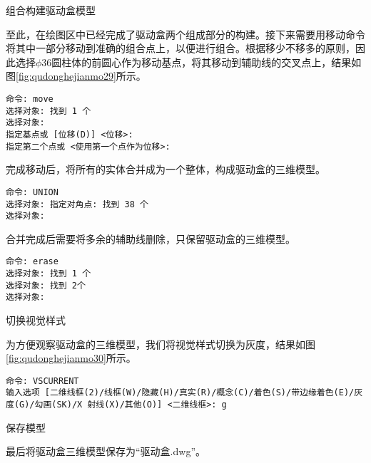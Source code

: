 \begin{procedure}
\item 组合构建驱动盒模型

至此，在绘图区中已经完成了驱动盒两个组成部分的构建。接下来需要用移动命令将其中一部分移动到准确的组合点上，以便进行组合。根据移少不移多的原则，因此选择$\phi 36$圆柱体的前圆心作为移动基点，将其移动到辅助线的交叉点上，结果如图\ref{fig:qudonghejianmo29}所示。

\begin{figure}[htbp]
\centering
\begin{floatrow}[2]
\end{floatrow}
\end{figure}
\begin{lstlisting}
命令: move
选择对象: 找到 1 个
选择对象:
指定基点或 [位移(D)] <位移>:
指定第二个点或 <使用第一个点作为位移>:
\end{lstlisting}

完成移动后，将所有的实体合并成为一个整体，构成驱动盒的三维模型。
\begin{lstlisting}
命令: UNION
选择对象: 指定对角点: 找到 38 个
选择对象:
\end{lstlisting}

合并完成后需要将多余的辅助线删除，只保留驱动盒的三维模型。

\begin{lstlisting}
命令: erase
选择对象: 找到 1 个
选择对象: 找到 2个
选择对象:
\end{lstlisting}

\item 切换视觉样式

为方便观察驱动盒的三维模型，我们将视觉样式切换为灰度，结果如图\ref{fig:qudonghejianmo30}所示。
\begin{lstlisting}
命令: VSCURRENT
输入选项 [二维线框(2)/线框(W)/隐藏(H)/真实(R)/概念(C)/着色(S)/带边缘着色(E)/灰度(G)/勾画(SK)/X 射线(X)/其他(O)] <二维线框>: g
\end{lstlisting}

\item 保存模型

最后将驱动盒三维模型保存为“驱动盒.dwg”。
\end{procedure}